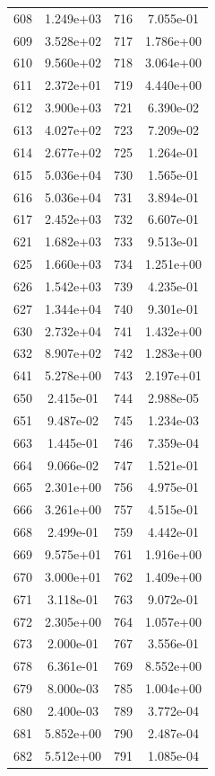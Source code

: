 \documentclass[12pt]{article}
\begin{document}
\begin{longtable}{@{}cccc@{}}
608 & 1.249e+03 & 716 & 7.055e-01 \\
609 & 3.528e+02 & 717 & 1.786e+00 \\
610 & 9.560e+02 & 718 & 3.064e+00 \\
611 & 2.372e+01 & 719 & 4.440e+00 \\
612 & 3.900e+03 & 721 & 6.390e-02 \\
613 & 4.027e+02 & 723 & 7.209e-02 \\
614 & 2.677e+02 & 725 & 1.264e-01 \\
615 & 5.036e+04 & 730 & 1.565e-01 \\
616 & 5.036e+04 & 731 & 3.894e-01 \\
617 & 2.452e+03 & 732 & 6.607e-01 \\
621 & 1.682e+03 & 733 & 9.513e-01 \\
625 & 1.660e+03 & 734 & 1.251e+00 \\
626 & 1.542e+03 & 739 & 4.235e-01 \\
627 & 1.344e+04 & 740 & 9.301e-01 \\
630 & 2.732e+04 & 741 & 1.432e+00 \\
632 & 8.907e+02 & 742 & 1.283e+00 \\
641 & 5.278e+00 & 743 & 2.197e+01 \\
650 & 2.415e-01 & 744 & 2.988e-05 \\
651 & 9.487e-02 & 745 & 1.234e-03 \\
663 & 1.445e-01 & 746 & 7.359e-04 \\
664 & 9.066e-02 & 747 & 1.521e-01 \\
665 & 2.301e+00 & 756 & 4.975e-01 \\
666 & 3.261e+00 & 757 & 4.515e-01 \\
668 & 2.499e-01 & 759 & 4.442e-01 \\
669 & 9.575e+01 & 761 & 1.916e+00 \\
670 & 3.000e+01 & 762 & 1.409e+00 \\
671 & 3.118e-01 & 763 & 9.072e-01 \\
672 & 2.305e+00 & 764 & 1.057e+00 \\
673 & 2.000e-01 & 767 & 3.556e-01 \\
678 & 6.361e-01 & 769 & 8.552e+00 \\
679 & 8.000e-03 & 785 & 1.004e+00 \\
680 & 2.400e-03 & 789 & 3.772e-04 \\
681 & 5.852e+00 & 790 & 2.487e-04 \\
682 & 5.512e+00 & 791 & 1.085e-04 \\

\end{longtable}
\end{document}
